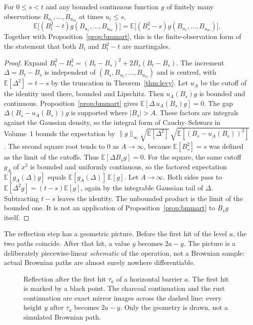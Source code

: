 \begin{proposition}\label{prop:bmsquare}
For $0\le s<t$ and any bounded continuous function $g$ of finitely many observations $B_{u_1},\ldots,B_{u_m}$ at times $u_i\le s$,
\[
 \mathbb E\bigl[(B_t^2-t)g(B_{u_1},\ldots,B_{u_m})\bigr]=\mathbb E\bigl[(B_s^2-s)g(B_{u_1},\ldots,B_{u_m})\bigr].
\]
Together with Proposition~\ref{prop:bmmart}, this is the finite-observation form of the statement that both $B_t$ and $B_t^2-t$ are martingales.
\end{proposition}
\begin{proof}
Expand $B_t^2-B_s^2=(B_t-B_s)^2+2B_s(B_t-B_s)$. The increment $\Delta=B_t-B_s$ is independent of $(B_s,B_{u_1},\ldots,B_{u_m})$ and is centred, with $\mathbb E[\Delta^2]=t-s$ by the truncation in Theorem~\ref{thm:levy}. Let $u_A$ be the cutoff of the identity used there, bounded and Lipschitz. Then $u_A(B_s)g$ is bounded and continuous. Proposition~\ref{prop:bmmart} gives $\mathbb E[\Delta\,u_A(B_s)g]=0$. The gap $\Delta(B_s-u_A(B_s))g$ is supported where $|B_s|>A$. These factors are integrals against the Gaussian density, so the integral form of Cauchy--Schwarz in Volume~1 bounds the expectation by $\|g\|_\infty\sqrt{\mathbb E[\Delta^2]}\,\sqrt{\mathbb E[(B_s-u_A(B_s))^2]}$. The second square root tends to $0$ as $A\to\infty$, because $\mathbb E[B_s^2]=s$ was defined as the limit of the cutoffs. Thus $\mathbb E[\Delta B_s g]=0$. For the square, the same cutoff $g_A$ of $x^2$ is bounded and uniformly continuous, so the factored expectation $\mathbb E[g_A(\Delta)g]$ equals $\mathbb E[g_A(\Delta)]\,\mathbb E[g]$. Let $A\to\infty$. Both sides pass to $\mathbb E[\Delta^2 g]=(t-s)\mathbb E[g]$, again by the integrable Gaussian tail of $\Delta$. Subtracting $t-s$ leaves the identity. The unbounded product is the limit of the bounded one. It is not an application of Proposition~\ref{prop:bmmart} to $B_s g$ itself.
\end{proof}

The reflection step has a geometric picture. Before the first hit of the level $a$, the two paths coincide. After that hit, a value $y$ becomes $2a-y$. The picture is a deliberately piecewise-linear \emph{schematic} of the operation, not a Brownian sample: actual Brownian paths are almost surely nowhere differentiable.

\begin{figure}[ht]
\centering
{}
\caption{Reflection after the first hit $\tau_a$ of a horizontal barrier $a$. The first hit is marked by a black point. The charcoal continuation and the rust continuation are exact mirror images across the dashed line: every height $y$ after $\tau_a$ becomes $2a-y$. Only the geometry is drawn, not a simulated Brownian path.}
\label{fig:bmreflection}
\end{figure}

